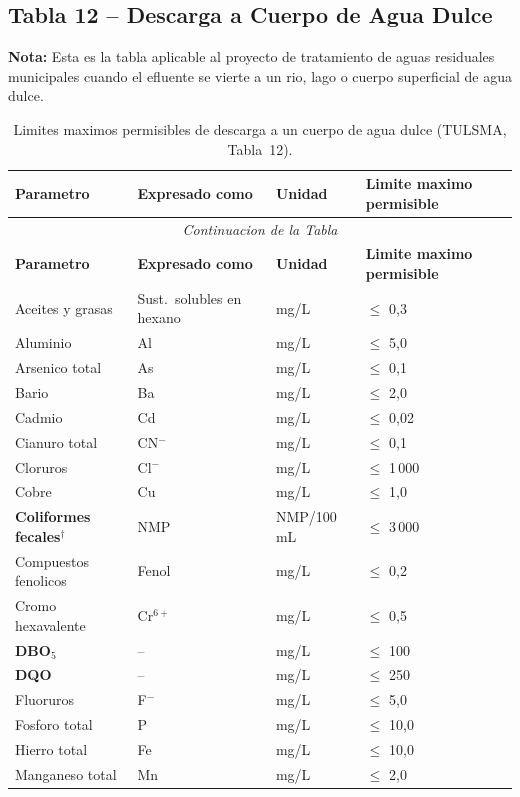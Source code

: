 \documentclass[12pt,a4paper]{article}
\begin{document}
\subsection{Tabla 12 -- Descarga a Cuerpo de Agua Dulce}
{\small\textbf{Nota:} Esta es la tabla aplicable al proyecto de tratamiento de aguas residuales municipales cuando el efluente se vierte a un rio, lago o cuerpo superficial de agua dulce.}
\vspace{6pt}
\small
\begin{longtable}{p{4.5cm}p{2.0cm}p{2.0cm}p{3.5cm}}
\caption{Limites maximos permisibles de descarga a un cuerpo de agua dulce (TULSMA, Tabla~12).}\\
\toprule
\textbf{Parametro} & \textbf{Expresado como} & \textbf{Unidad} & \textbf{Limite maximo permisible} \\
\midrule
\endfirsthead
\multicolumn{4}{c}{\small\itshape Continuacion de la Tabla}\\
\toprule
\textbf{Parametro} & \textbf{Expresado como} & \textbf{Unidad} & \textbf{Limite maximo permisible} \\
\midrule
\endhead
\bottomrule
\endlastfoot
Aceites y grasas & Sust.\ solubles en hexano & mg/L & $\leq$ 0,3 \\
Aluminio & Al & mg/L & $\leq$ 5,0 \\
Arsenico total & As & mg/L & $\leq$ 0,1 \\
Bario & Ba & mg/L & $\leq$ 2,0 \\
Cadmio & Cd & mg/L & $\leq$ 0,02 \\
Cianuro total & CN$^-$ & mg/L & $\leq$ 0,1 \\
Cloruros & Cl$^-$ & mg/L & $\leq$ 1\,000 \\
Cobre & Cu & mg/L & $\leq$ 1,0 \\
\textbf{Coliformes fecales}$^\dagger$ & NMP & NMP/100 mL & $\leq$ 3\,000 \\
Compuestos fenolicos & Fenol & mg/L & $\leq$ 0,2 \\
Cromo hexavalente & Cr$^{6+}$ & mg/L & $\leq$ 0,5 \\
\textbf{DBO$_5$} & -- & mg/L & $\leq$ 100 \\
\textbf{DQO} & -- & mg/L & $\leq$ 250 \\
Fluoruros & F$^-$ & mg/L & $\leq$ 5,0 \\
Fosforo total & P & mg/L & $\leq$ 10,0 \\
Hierro total & Fe & mg/L & $\leq$ 10,0 \\
Manganeso total & Mn & mg/L & $\leq$ 2,0 \\

\end{longtable}
\end{document}
